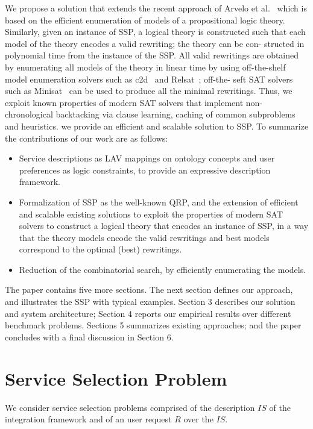 \documentclass{llncs}
\begin{document}
We propose a solution that extends the recent approach of Arvelo et al.\ \cite{arvelo:aaai06}
which is based on the efficient enumeration of models of a propositional logic 
theory. Similarly, given an instance of SSP, a logical theory is constructed such 
that each model of the theory encodes a valid rewriting; the theory can be con- 
structed in polynomial time from the instance of the SSP. All valid rewritings 
are obtained by enumerating all models of the theory in linear time by using 
off-the-shelf model enumeration solvers such as c2d~\cite{c2d} and Relsat~\cite{relsat}; off-the- 
seft SAT solvers such as Minisat~\cite{minisat} can be used to produce all the minimal 
rewritings. Thus, we exploit known properties of modern SAT solvers that 
implement non-chronological backtacking via clause learning, caching of common 
subproblems and heuristics. we provide an efficient and scalable solution to SSP. 
To summarize the contributions of our work are as follows:
\begin{itemize}
\item Service descriptions as LAV mappings on ontology concepts and user preferences as logic constraints, to provide an expressive description framework.
\item Formalization of SSP as the well-known QRP, and the extension of efficient and scalable existing solutions to exploit the properties of modern SAT solvers to construct a logical theory that encodes an instance of SSP, in a way that the theory models encode the valid rewritings and best models 
correspond to the optimal (best) rewritings.
\item Reduction of the combinatorial search, by efficiently enumerating the models.
\end{itemize}

The paper contains five more sections. The next section defines our approach, 
and illustrates the SSP with typical examples. Section 3 describes our solution 
and system architecture; Section 4 reports our empirical results over different
benchmark problems. Sections 5 summarizes existing approaches; and the paper 
concludes with a final discussion in Section 6.

\section{Service Selection Problem}
We consider service selection problems comprised of the
description $IS$ of the integration framework and of an
user request $R$ over the $IS$.
\end{document}
